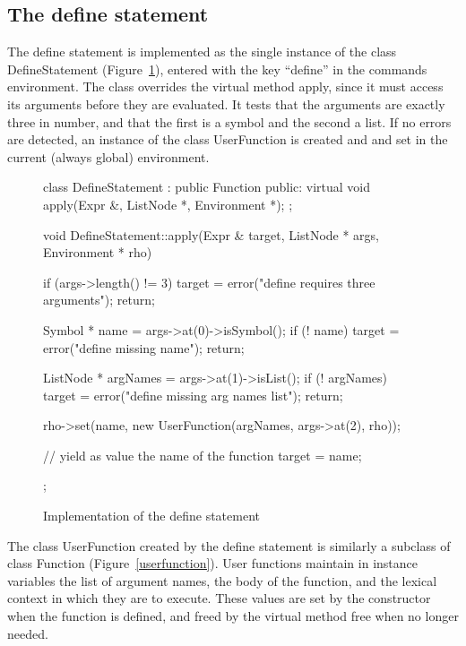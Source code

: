 \subsection{The define statement}

The define statement is implemented as the single instance of the class
{\sf DefineStatement} (Figure~\ref{define}), entered with the key
``define'' in the {\sf commands} environment.  The class overrides the
virtual method {\sf apply}, since it must access its arguments before they
are evaluated.  It tests that the arguments are exactly three in number,
and that the first is a symbol and the second a list.
If no errors are detected, an instance of the class {\sf UserFunction} is
created and and set in the current (always global) environment.

\begin{figure}
\begin{cprog}
class DefineStatement : public Function {
public:
	virtual void apply(Expr &, ListNode *, Environment *);
};

void DefineStatement::apply(Expr & target, ListNode * args, Environment * rho)
{
	if (args->length() != 3) {
		target = error("define requires three arguments");
		return;
		}

	Symbol * name = args->at(0)->isSymbol();
	if (! name) {
		target = error("define missing name");
		return;
		}

	ListNode * argNames = args->at(1)->isList();
	if (! argNames) {
		target = error("define missing arg names list");
		return;
		}

	rho->set(name, new UserFunction(argNames, args->at(2), rho));

	// yield as value the name of the function
	target = name;
};
\end{cprog}
\caption{Implementation of the {\sf define} statement}\label{define}
\end{figure}

The class {\sf UserFunction} created by the define statement is similarly a
subclass of class {\sf Function} (Figure~\ref{userfunction}).
User functions maintain in instance variables the list of argument names, 
the body of the
function, and the lexical context in which they are to execute.
These values are set by the constructor when the function is defined,
and freed by the virtual method {\sf free} when no longer needed.

